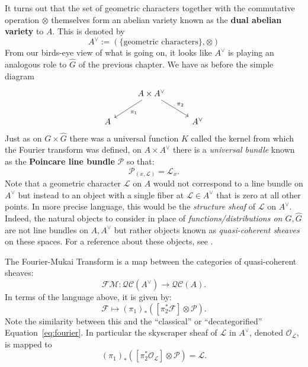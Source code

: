 It turns out that the set of geometric characters together with the commutative operation $\otimes$ themselves form an abelian variety known as the \textbf{dual abelian variety} to $A$. This is denoted by
\[
	A^\vee := (\{\text{geometric characters}\}, \otimes)
\]
From our birds-eye view of what is going on, it looks like $A^\vee$ is playing an analogous role to $\hat G$ of the previous chapter. We have as before the simple diagram
\[
	\begin{tikzcd}
		& A \times A^\vee \arrow[ld,"\pi_1"] \arrow[rd,"\pi_2"]&\\
		A & & A^\vee
	\end{tikzcd}
\]
Just as on $G \times \hat G$ there was a universal function $K$ called the kernel from which the Fourier transform was defined, on $A \times A^\vee$ there is a \emph{universal bundle} known as the \textbf{Poincare line bundle} $\mathcal P$ so that:
\[
	\mathcal P_{(x, \mathcal L)} = \mathcal L_x.
\]
Note that a geometric character $\mathcal L$ on $A$ would not correspond to a line bundle on $A^\vee$ but instead to an object with a single fiber at $\mathcal L \in A^\vee$ that is zero at all other points. In more precise language, this would be the \emph{structure sheaf} of $\mathcal L$ on $A^\vee$. Indeed, the natural objects to consider in place of \emph{functions/distributions on $G, \hat G$} are not line bundles on $A, A^\vee$ but rather objects known as \emph{quasi-coherent sheaves} on these spaces. For a reference about these objects, see \cite{hartshorne1977}.
\begin{concept}
	The Fourier-Mukai Transform is a map between the categories of quasi-coherent sheaves:
	\[
		\mathcal{FM}: \mathcal{QC}(A^\vee) \to \mathcal{QC}(A).
	\]
	In terms of the language above, it is given by:
	\[
		\mathcal F \mapsto (\pi_1)_* ([\pi_2^* \mathcal F] \otimes \mathcal P) .
	\]
	Note the similarity between this and the ``classical'' or ``decategorified'' Equation~\eqref{eq:fourier}. 
	In particular the skyscraper sheaf of $\mathcal L$ in $A^\vee$, denoted $\mathcal O_{\mathcal L}$, is mapped to 
	\[
		(\pi_1)_* ([\pi_2^* \mathcal O_{\mathcal L}] \otimes \mathcal P) = \mathcal L.
	\]
\end{concept}

